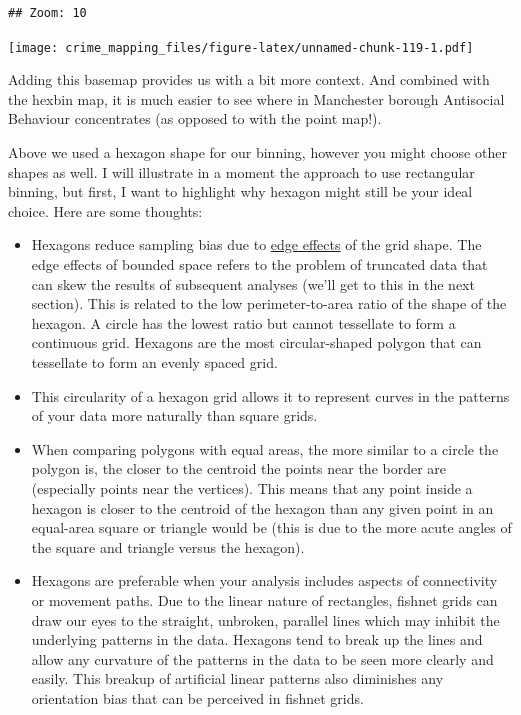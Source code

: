 \documentclass[
]{book}
\providecommand{\tightlist}{%
  \setlength{\itemsep}{0pt}\setlength{\parskip}{0pt}}
\begin{document}
\begin{verbatim}
## Zoom: 10
\end{verbatim}

\texttt{[image: crime\_mapping\_files/figure-latex/unnamed-chunk-119-1.pdf]}

Adding this basemap provides us with a bit more context. And combined with the hexbin map, it is much easier to see where in Manchester borough Antisocial Behaviour concentrates (as opposed to with the point map!).

Above we used a hexagon shape for our binning, however you might choose other shapes as well. I will illustrate in a moment the approach to use rectangular binning, but first, I want to highlight why hexagon might still be your ideal choice. Here are some thoughts:

\begin{itemize}
\tightlist
\item
  Hexagons reduce sampling bias due to \href{https://link.springer.com/chapter/10.1007/978-0-387-09688-9_5}{edge effects} of the grid shape. The edge effects of bounded space refers to the problem of truncated data that can skew the results of subsequent analyses (we'll get to this in the next section). This is related to the low perimeter-to-area ratio of the shape of the hexagon. A circle has the lowest ratio but cannot tessellate to form a continuous grid. Hexagons are the most circular-shaped polygon that can tessellate to form an evenly spaced grid.
\item
  This circularity of a hexagon grid allows it to represent curves in the patterns of your data more naturally than square grids.
\item
  When comparing polygons with equal areas, the more similar to a circle the polygon is, the closer to the centroid the points near the border are (especially points near the vertices). This means that any point inside a hexagon is closer to the centroid of the hexagon than any given point in an equal-area square or triangle would be (this is due to the more acute angles of the square and triangle versus the hexagon).
\item
  Hexagons are preferable when your analysis includes aspects of connectivity or movement paths. Due to the linear nature of rectangles, fishnet grids can draw our eyes to the straight, unbroken, parallel lines which may inhibit the underlying patterns in the data. Hexagons tend to break up the lines and allow any curvature of the patterns in the data to be seen more clearly and easily. This breakup of artificial linear patterns also diminishes any orientation bias that can be perceived in fishnet grids.

\end{itemize}
\end{document}
